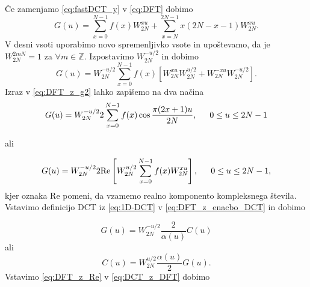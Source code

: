 \documentclass[a4paper,12pt,openright]{book}
\begin{document}
Če zamenjamo \eqref{eq:fastDCT_y} v \eqref{eq:DFT} dobimo
\begin{equation}
  G(u) = \sum_{x=0}^{N-1} f(x) W_{2N}^{xu} + \sum_{x=N}^{2N-1} x(2N-x-1) W_{2N}^{xu}.
\label{eq:DFT_z_g1}
\end{equation}
V desni vsoti uporabimo novo spremenljivko vsote in upoštevamo, da je $W_{2N}^{2mN} = 1$ za $\forall m \in \mathbb{Z}$. Izpostavimo $W_{2N}^{-u/2}$ in dobimo
\begin{equation}
  G(u) = W_{2N}^{-u/2}\sum_{x=0}^{N-1} f(x) \left[ W_{2N}^{xu}W_{2N}^{u/2} + W_{2N}^{-xu}W_{2N}^{-u/2} \right].
\label{eq:DFT_z_g2}
\end{equation}
Izraz v \eqref{eq:DFT_z_g2} lahko zapišemo na dva načina
\begin{equation}
  G(u) = W_{2N}^{-u/2} 2 \sum_{x=0}^{N-1} f(x) \cos\frac{\pi(2x+1)u}{2N}, \indent 0 \leq u \leq 2N-1
\label{eq:DFT_z_enacbo_DCT}
\end{equation}

ali

\begin{equation}
  G(u) = W_{2N}^{-u/2} 2 \mbox{Re} \left[ W_{2N}^{u/2} \sum_{x=0}^{N-1} f(x) W_{2N}^{xu} \right], \indent 0 \leq u \leq 2N-1
\label{eq:DFT_z_Re},
\end{equation}
kjer oznaka Re pomeni, da vzamemo realno komponento kompleksnega šte\-vi\-la.
Vstavimo definicijo DCT iz \eqref{eq:1D-DCT} v \eqref{eq:DFT_z_enacbo_DCT} in dobimo

\begin{equation}
  G(u) = W_{2N}^{-u/2} \frac{2}{\alpha(u)} C(u)
\label{eq:DFT_z_DCT}
\end{equation}
ali
\begin{equation}
  C(u) = W_{2N}^{u/2} \frac{\alpha(u)}{2} G(u).
\label{eq:DCT_z_DFT}
\end{equation}
Vstavimo \eqref{eq:DFT_z_Re} v \eqref{eq:DCT_z_DFT} dobimo
\end{document}
